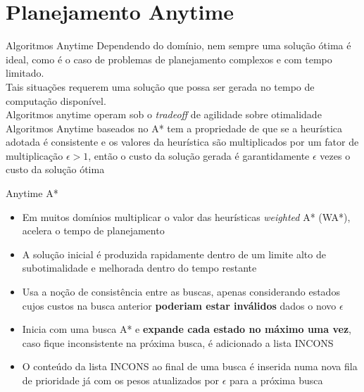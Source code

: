 \documentclass[10pt]{beamer}
\begin{document}
\section{Planejamento Anytime}

\begin{frame}{Algoritmos Anytime}
Dependendo do domínio, nem sempre uma solução ótima é ideal, como é o caso de problemas de planejamento complexos e com tempo limitado. \\
\newline Tais situações requerem uma solução que possa ser gerada no tempo de computação disponível. \\
\newline \alert{Algoritmos anytime} operam sob o \textit{tradeoff} de agilidade sobre otimalidade  \\
\newline \justifying Algoritmos Anytime baseados no A* tem a propriedade de que se a heurística adotada é consistente e os valores da heurística são multiplicados por um fator de multiplicação $\epsilon > 1$, então o custo da solução gerada é garantidamente $\epsilon$ vezes o custo da solução ótima 
\end{frame}

\begin{frame}{Anytime A*}
\begin{itemize}
\item Em muitos domínios multiplicar o valor das heurísticas \textit{weighted} A* (WA*), acelera o tempo de planejamento
\vspace{3px}
\item A solução inicial é produzida rapidamente dentro de um limite alto de subotimalidade e melhorada dentro do tempo restante
\vspace{3px}
\item Usa a noção de consistência entre as buscas, apenas considerando estados cujos custos na busca anterior \textbf{poderiam estar inválidos} dados o novo \textbf{$\epsilon$}
\vspace{3px}
\item Inicia com uma busca A* e \textbf{expande cada estado no máximo uma vez}, caso fique inconsistente na próxima busca, é adicionado a lista INCONS
\vspace{3px}
\item O conteúdo da lista INCONS ao final de uma busca é inserida numa nova fila de prioridade já com os pesos atualizados por \textbf{$\epsilon$} para a próxima busca  
\end{itemize}
\end{frame}
\end{document}
